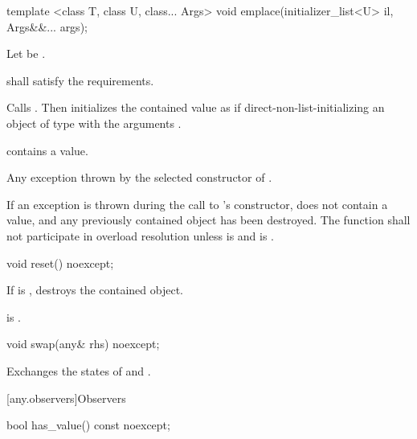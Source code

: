 %
\begin{itemdecl}
template <class T, class U, class... Args>
  void emplace(initializer_list<U> il, Args&&... args);
\end{itemdecl}

\begin{itemdescr}
\pnum
Let  be .

\pnum
\requires
{} shall satisfy the  requirements.

\pnum
\effects Calls . Then initializes the contained value
as if direct-non-list-initializing an object of type  with the arguments
.

\pnum
\postconditions {} contains a value.

\pnum
\throws Any exception thrown by the selected constructor of .

\pnum
\remarks If an exception is thrown during the call to 's constructor,
 does not contain a value, and any previously contained object
has been destroyed.
The function shall not participate in overload resolution unless
 is  and
 is .
\end{itemdescr}

%
\begin{itemdecl}
void reset() noexcept;
\end{itemdecl}

\begin{itemdescr}
\pnum
\effects
If  is , destroys the contained object.

\pnum
\postconditions
{} is .
\end{itemdescr}

%
\begin{itemdecl}
void swap(any& rhs) noexcept;
\end{itemdecl}

\begin{itemdescr}

\pnum
\effects
Exchanges the states of  and .
\end{itemdescr}

[any.observers]{Observers}

%
\begin{itemdecl}
bool has_value() const noexcept;
\end{itemdecl}

